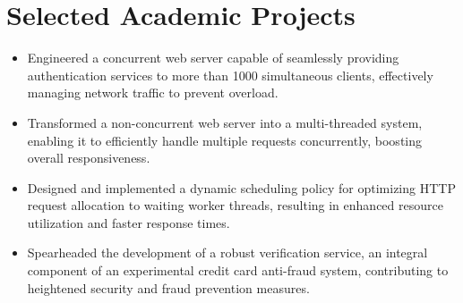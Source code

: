 \documentclass{resume}
\begin{document}

\section{Selected Academic Projects}
\begin{itemize}
  \item Engineered a concurrent web server capable of seamlessly providing authentication services to more than 1000 simultaneous clients, effectively managing network traffic to prevent overload.
  \item Transformed a non-concurrent web server into a multi-threaded system, enabling it to efficiently handle multiple requests concurrently, boosting overall responsiveness.
  \item  Designed and implemented a dynamic scheduling policy for optimizing HTTP request allocation to waiting worker threads, resulting in enhanced resource utilization and faster response times.
  \item Spearheaded the development of a robust verification service, an integral component of an experimental credit card anti-fraud system, contributing to heightened security and fraud prevention measures.
\end{itemize}
\end{document}
